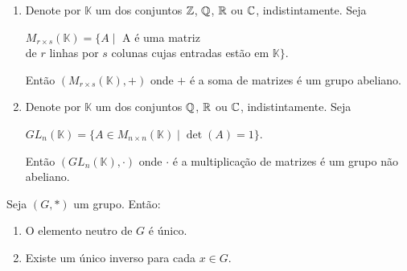 \documentclass{beamer}
\begin{document}
    \begin{frame}
        \begin{exemplos}
            \begin{enumerate}[label={\arabic*})]
                \conti

                \item Denote por $\mathbb{K}$ um dos conjuntos $\mathbb{Z}$, $\mathbb{Q}$, $\mathbb{R}$ ou $\mathbb{C}$, indistintamente. Seja
                \begin{center}
                    $M_{r \times s}(\mathbb{K}) = \{A \mid $ A \'e uma matriz \\de $r$ linhas por $s$ colunas cujas entradas est\~ao em $\mathbb{K}\}$.
                \end{center}
                Ent\~ao $(M_{r \times s}(\mathbb{K}), +)$ onde $+$ \'e a soma de matrizes \'e um grupo abeliano.

                \vspace{.3cm}

                \item Denote por $\mathbb{K}$ um dos conjuntos $\mathbb{Q}$, $\mathbb{R}$ ou $\mathbb{C}$, indistintamente. Seja
                \begin{center}
                    $GL_n(\mathbb{K}) = \{A \in M_{n \times n}(\mathbb{K}) \mid \det(A) = 1\}$.
                \end{center}
                Ent\~ao $(GL_n(\mathbb{K}), \cdot)$ onde $\cdot$ \'e a multiplica\c{c}\~ao de matrizes \'e um grupo n\~ao abeliano.
            \end{enumerate}
        \end{exemplos}
    \end{frame}

    \begin{frame}
        \begin{proposicao}
            Seja $(G,*)$ um grupo. \pause Ent\~ao:\pause
            \begin{enumerate}[label={\roman*})]
                \item O elemento neutro de $G$ {\'e} {\'u}nico.\pause

                \vspace{.3cm}

                \item Existe um {\'u}nico inverso para cada $x \in G$.\pause

                \seti
            \end{enumerate}
        \end{proposicao}
    \end{frame}
\end{document}
